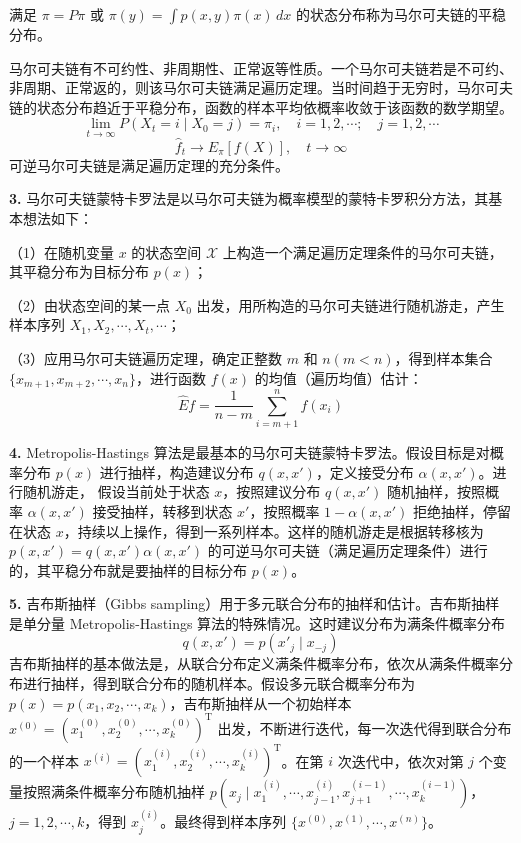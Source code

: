 \documentclass[UTF8, 12pt, fontset=fandol, oneside]{ctexart}
\begin{document}
满足 $\pi=P\pi$ 或 $\pi(y)=\int p(x,y)\pi(x)\,dx$ 的状态分布称为马尔可夫链的平稳分布。

马尔可夫链有不可约性、非周期性、正常返等性质。一个马尔可夫链若是不可约、非周期、正常返的，则该马尔可夫链满足遍历定理。当时间趋于无穷时，马尔可夫链的状态分布趋近于平稳分布，函数的样本平均依概率收敛于该函数的数学期望。
\[
\lim_{t\to\infty}P(X_t=i\mid X_0=j)=\pi_i,\quad i=1,2,\cdots;\quad j=1,2,\cdots
\]
\[
\hat f_t\to E_\pi[f(X)],\quad t\to\infty
\]
可逆马尔可夫链是满足遍历定理的充分条件。

\noindent\textbf{3.} 马尔可夫链蒙特卡罗法是以马尔可夫链为概率模型的蒙特卡罗积分方法，其基本想法如下：

（1）在随机变量 $x$ 的状态空间 $\mathcal{X}$ 上构造一个满足遍历定理条件的马尔可夫链，其平稳分布为目标分布 $p(x)$；

（2）由状态空间的某一点 $X_0$ 出发，用所构造的马尔可夫链进行随机游走，产生样本序列 $X_1,X_2,\cdots,X_t,\cdots$；

（3）应用马尔可夫链遍历定理，确定正整数 $m$ 和 $n(m<n)$，得到样本集合 $\{x_{m+1},x_{m+2},\cdots,x_n\}$，进行函数 $f(x)$ 的均值（遍历均值）估计：
\[
\hat E f=\frac{1}{n-m}\sum_{i=m+1}^{n}f(x_i)
\]

\noindent\textbf{4.} Metropolis-Hastings 算法是最基本的马尔可夫链蒙特卡罗法。假设目标是对概率分布 $p(x)$ 进行抽样，构造建议分布 $q(x,x')$，定义接受分布 $\alpha(x,x')$。进行随机游走，
假设当前处于状态 $x$，按照建议分布 $q(x,x')$ 随机抽样，按照概率 $\alpha(x,x')$ 接受抽样，转移到状态 $x'$，按照概率 $1-\alpha(x,x')$ 拒绝抽样，停留在状态 $x$，持续以上操作，得到一系列样本。这样的随机游走是根据转移核为 $p(x,x')=q(x,x')\alpha(x,x')$ 的可逆马尔可夫链（满足遍历定理条件）进行的，其平稳分布就是要抽样的目标分布 $p(x)$。

\noindent\textbf{5.} 吉布斯抽样（Gibbs sampling）用于多元联合分布的抽样和估计。吉布斯抽样是单分量 Metropolis-Hastings 算法的特殊情况。这时建议分布为满条件概率分布
\[
q(x,x')=p(x'_j\mid x_{-j})
\]
吉布斯抽样的基本做法是，从联合分布定义满条件概率分布，依次从满条件概率分布进行抽样，得到联合分布的随机样本。假设多元联合概率分布为 $p(x)=p(x_1,x_2,\cdots,x_k)$，吉布斯抽样从一个初始样本 $x^{(0)}=(x_1^{(0)},x_2^{(0)},\cdots,x_k^{(0)})^{\mathrm{T}}$ 出发，不断进行迭代，每一次迭代得到联合分布的一个样本 $x^{(i)}=(x_1^{(i)},x_2^{(i)},\cdots,x_k^{(i)})^{\mathrm{T}}$。在第 $i$ 次迭代中，依次对第 $j$ 个变量按照满条件概率分布随机抽样 $p(x_j\mid x_1^{(i)},\cdots,x_{j-1}^{(i)},x_{j+1}^{(i-1)},\cdots,x_k^{(i-1)})$，$j=1,2,\cdots,k$，得到 $x_j^{(i)}$。最终得到样本序列 $\{x^{(0)},x^{(1)},\cdots,x^{(n)}\}$。
\end{document}
